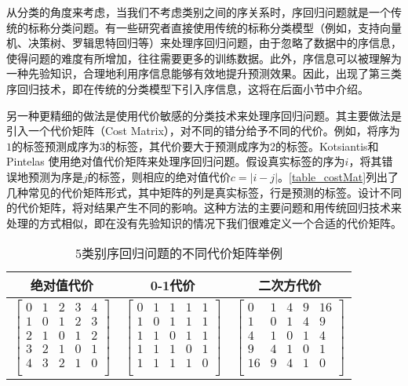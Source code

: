 从分类的角度来考虑，当我们不考虑类别之间的序关系时，序回归问题就是一个传统的标称分类问题。有一些研究者直接使用传统的标称分类模型（例如，支持向量机、决策树、罗辑思特回归等）来处理序回归问题，由于忽略了数据中的序信息，使得问题的难度有所增加，往往需要更多的训练数据。此外，序信息可以被理解为一种先验知识，合理地利用序信息能够有效地提升预测效果。因此，出现了第三类序回归技术，即在传统的分类模型下引入序信息，这将在后面小节中介绍。

另一种更精细的做法是使用代价敏感的分类技术来处理序回归问题。其主要做法是引入一个代价矩阵（Cost Matrix），对不同的错分给予不同的代价。例如，将序为\(1\)的标签预测成序为\(3\)的标签，其代价要大于预测成序为\(2\)的标签。Kotsiantis和Pintelas\citep{kotsiantis2004cost}
使用绝对值代价矩阵来处理序回归问题。假设真实标签的序为\(i\)，将其错误地预测为序是\(j\)的标签，则相应的绝对值代价\(c = \left |  i - j \right |\)。\autoref{table_costMat}列出了几种常见的代价矩阵形式，其中矩阵的列是真实标签，行是预测的标签。设计不同的代价矩阵，将对结果产生不同的影响。这种方法的主要问题和用传统回归技术来处理的方式相似，即在没有先验知识的情况下我们很难定义一个合适的代价矩阵。

\begin{table}[!htbp]
\caption{5类别序回归问题的不同代价矩阵举例}
\label{table_costMat}
\centering
\begin{tabular}{ccc}
\toprule
绝对值代价 & 0-1代价 & 二次方代价 \\
\midrule
$ \left[
 \begin{matrix}
   0 & 1 & 2 & 3 & 4 \\
   1 & 0 & 1 & 2 & 3 \\
   2 & 1 & 0 & 1 & 2 \\
   3 & 2 & 1 & 0 & 1 \\
   4 & 3 & 2 & 1 & 0 \\
  \end{matrix}
  \right]
$

&

$ \left[
 \begin{matrix}
   0 & 1 & 1 & 1 & 1 \\
   1 & 0 & 1 & 1 & 1 \\
   1 & 1 & 0 & 1 & 1 \\
   1 & 1 & 1 & 0 & 1 \\
   1 & 1 & 1 & 1 & 0 \\
  \end{matrix}
  \right]
$

&

$ \left[
 \begin{matrix}
   0 & 1 & 4 & 9 & 16 \\
   1 & 0 & 1 & 4 & 9  \\
   4 & 1 & 0 & 1 & 4 \\
   9 & 4 & 1 & 0 & 1 \\
   16 & 9 & 4 & 1 & 0 \\
  \end{matrix}
  \right]
$
\\
\bottomrule
\end{tabular}
\end{table}

